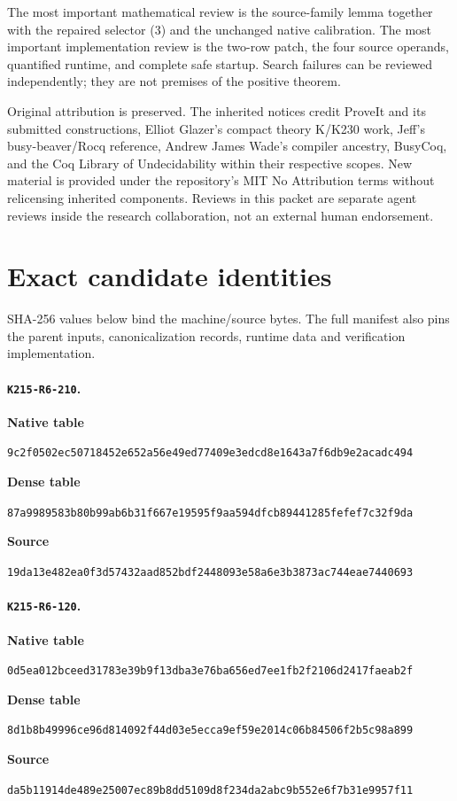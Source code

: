 \documentclass[11pt,a4paper]{article}
\theoremstyle{remark}\newtheorem{remark}[theorem]{Remark}
\newcommand{\rhoa}{\texttt{K215-R6-210}}
\newcommand{\rhob}{\texttt{K215-R6-120}}
\begin{document}
The most important mathematical review is the source-family lemma
together with the repaired selector (3) and the unchanged native
calibration. The most important implementation review is the two-row
patch, the four source operands, quantified runtime, and complete
safe startup. Search failures can be reviewed independently; they
are not premises of the positive theorem.

Original attribution is preserved. The inherited notices credit
ProveIt and its submitted constructions, Elliot Glazer's compact
theory K/K230 work, Jeff's busy-beaver/Rocq reference, Andrew James
Wade's compiler ancestry, BusyCoq, and the Coq Library of
Undecidability within their respective scopes. New material is
provided under the repository's MIT No Attribution terms without
relicensing inherited components. Reviews in this packet are
separate agent reviews inside the research collaboration, not an
external human endorsement.

\clearpage
\appendix
\section{Exact candidate identities}

SHA-256 values below bind the machine/source bytes. The full manifest
also pins the parent inputs, canonicalization records, runtime data
and verification implementation.
\small
\paragraph{\rhoa.}
\textbf{Native table}\par
\nolinkurl{9c2f0502ec50718452e652a56e49ed77409e3edcd8e1643a7f6db9e2acadc494}
\par\textbf{Dense table}\par
\nolinkurl{87a9989583b80b99ab6b31f667e19595f9aa594dfcb89441285fefef7c32f9da}
\par\textbf{Source}\par
\nolinkurl{19da13e482ea0f3d57432aad852bdf2448093e58a6e3b3873ac744eae7440693}
\paragraph{\rhob.}
\textbf{Native table}\par
\nolinkurl{0d5ea012bceed31783e39b9f13dba3e76ba656ed7ee1fb2f2106d2417faeab2f}
\par\textbf{Dense table}\par
\nolinkurl{8d1b8b49996ce96d814092f44d03e5ecca9ef59e2014c06b84506f2b5c98a899}
\par\textbf{Source}\par
\nolinkurl{da5b11914de489e25007ec89b8dd5109d8f234da2abc9b552e6f7b31e9957f11}
\normalsize
\end{document}
